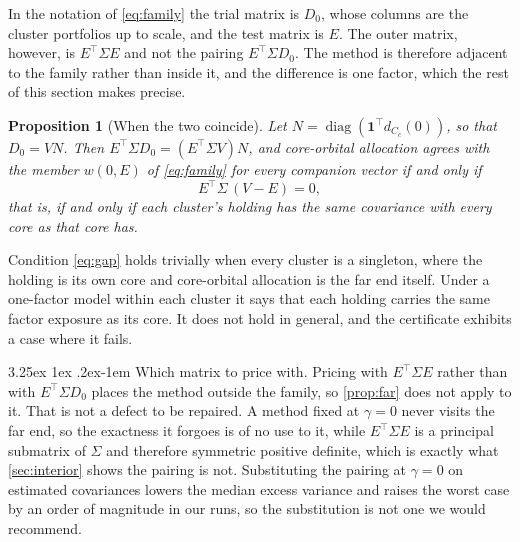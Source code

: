 \documentclass[11pt]{article}
\makeatletter
\renewcommand\paragraph{\@startsection{paragraph}{4}{\z@}%
  {3.25ex \@plus1ex \@minus.2ex}{-1em}%
  {\normalfont\normalsize\itshape}}
\newcommand{\ones}{\mathbf{1}}
\DeclareMathOperator{\diag}{diag}
\newtheorem{proposition}{Proposition}
\makeatother
\begin{document}
In the notation of \eqref{eq:family} the trial matrix is $D_0$, whose columns are
the cluster portfolios up to scale, and the test matrix is $E$. The outer
matrix, however, is $E^\top\Sigma E$ and not the pairing $E^\top\Sigma D_0$. The
method is therefore adjacent to the family rather than inside it, and the
difference is one factor, which the rest of this section makes precise.

\begin{proposition}[When the two coincide]
\label{prop:hcoa}
Let $N=\diag(\ones^\top d_{C_c}(0))$, so that $D_0=VN$. Then
$E^\top\Sigma D_0=(E^\top\Sigma V)N$, and core-orbital allocation agrees with
the member $w(0,E)$ of \eqref{eq:family} for every companion vector if and only
if
\begin{equation}
  E^\top\Sigma\,(V-E)=0 ,
  \label{eq:gap}
\end{equation}
that is, if and only if each cluster's holding has the same covariance with
every core as that core has.
\end{proposition}

Condition \eqref{eq:gap} holds trivially when every cluster is a singleton,
where the holding is its own core and core-orbital allocation is the far end
itself. Under a one-factor model within each cluster it says that each holding
carries the same factor exposure as its core. It does not hold in general, and
the certificate exhibits a case where it fails.

\paragraph{Which matrix to price with.} Pricing with $E^\top\Sigma E$ rather
than with $E^\top\Sigma D_0$ places the method outside the family, so
\cref{prop:far} does not apply to it. That is not a defect to be repaired. A
method fixed at $\gamma=0$ never visits the far end, so the exactness it forgoes
is of no use to it, while $E^\top\Sigma E$ is a principal submatrix of $\Sigma$
and therefore symmetric positive definite, which is exactly what
\cref{sec:interior} shows the pairing is not. Substituting the pairing at
$\gamma=0$ on estimated covariances lowers the median excess variance and raises
the worst case by an order of magnitude in our runs, so the substitution is not
one we would recommend.
\end{document}
